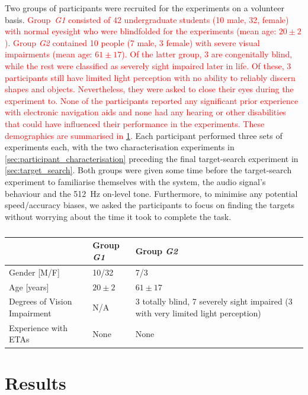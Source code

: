 \documentclass[acmsmall]{acmart}
\newcommand\hl[1]{\textcolor{red}{#1}}
\begin{document}
Two groups of participants were recruited for the experiments on a volunteer basis. 
\hl{Group~\textit{G1} consisted of 42 undergraduate students (10 male, 32, female) with normal eyesight who were blindfolded for the experiments (mean age: $20\pm2$).
Group \textit{G2} contained 10 people (7 male, 3 female) with severe visual impairments (mean age: $61\pm17$).
Of the latter group, 3 are congenitally blind, while the rest were classified as severely sight impaired later in life.
Of these, 3 participants still have limited light perception with no ability to reliably discern shapes and objects. 
Nevertheless, they were asked to close their eyes during the experiment to. 
None of the participants reported any significant prior experience with electronic navigation aids and none had any hearing or other disabilities that could have influenced their performance in the experiments.
These demographics are summarised in \cref{tab:demographics}.}
Each participant performed three sets of experiments each, with the two characterisation experiments in \cref{sec:participant_characterisation} preceding the final target-search experiment in \cref{sec:target_search}. 
Both groups were given some time before the target-search experiment to familiarise themselves with the system, the audio signal's behaviour and the \SI{512}{\hertz} on-level tone. 
Furthermore, to minimise any potential speed/accuracy biases, we asked the participants to focus on finding the targets without worrying about the time it took to complete the task. 

\begin{table}
  \centering
  \caption{}\label{tab:demographics}
  \begin{tabular}{p{2.7cm}p{1.8cm}p{6cm}}
    \toprule
                                 & Group \textit{G1} & Group \textit{G2} \\\midrule
    Gender [M/F]                 & 10/32    & 7/3 \\
    Age [years]                  & $20\pm2$ & $61\pm17$ \\
    Degrees of Vision Impairment & N/A      & 3 totally blind, 7 severely sight impaired (3 with very limited light perception) \\
    Experience with ETAs         & None     & None \\
    \bottomrule
  \end{tabular}
\end{table}

\section{Results}\label{sec:results}
\end{document}

